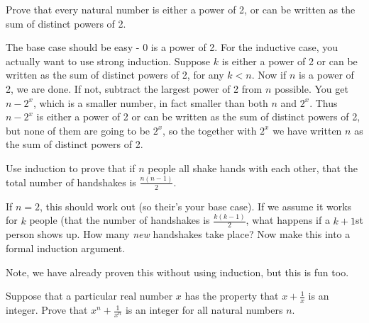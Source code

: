 \begin{questions}
	
\question Prove that every natural number is either a power of 2, or can be written as the sum of distinct powers of 2.

	\begin{answer}
		The base case should be easy - 0 is a power of 2.  For the inductive case, you actually want to use strong induction.  Suppose $k$ is either a power of 2 or can be written as the sum of distinct powers of 2, for any $k < n$.  Now if $n$ is a power of 2, we are done.  If not, subtract the largest power of 2 from $n$ possible.  You get $n - 2^x$, which is a smaller number, in fact smaller than both $n$ and $2^x$.  Thus $n-2^x$ is either a power of 2 or can be written as the sum of distinct powers of 2, but none of them are going to be $2^x$, so the together with $2^x$ we have written $n$ as the sum of distinct powers of 2.
	\end{answer}	

\question  Use induction to prove that if $n$ people all shake hands with each other, that the total number of handshakes is $\frac{n(n-1)}{2}$. 

	\begin{answer}
	  If $n = 2$, this should work out (so their's your base case).  If we assume it works for $k$ people (that the number of handshakes is $\frac{k(k-1)}{2}$, what happens if a $k+1$st person shows up.  How many {\em new} handshakes take place?  Now make this into a formal induction argument.
	  
	  Note, we have already proven this without using induction, but this is fun too.
	\end{answer}

%

\question Suppose that a particular real number $x$ has the property that $x + \frac{1}{x}$ is an integer.  Prove that $x^n + \frac{1}{x^n}$ is an integer for all natural numbers $n$.


\end{questions}
